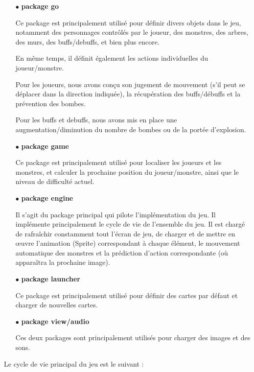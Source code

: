 \documentclass[11pt,english]{article}
\begin{document}
\begin{itemize}
    \item [$\bullet$] \textbf{package go}
    
    Ce package est principalement utilisé pour définir divers objets dans le jeu, notamment des personnages contrôlés par le joueur, des monstres, des arbres, des murs, des buffs/debuffs, et bien plus encore.
    
    En même temps, il définit également les actions individuelles du joueur/monstre. 

    Pour les joueurs, nous avons conçu son jugement de mouvement (s'il peut se déplacer dans la direction indiquée), la récupération des buffs/débuffs et la prévention des bombes.

    Pour les buffs et debuffs, nous avons mis en place une augmentation/diminution du nombre de bombes ou de la portée d'explosion.

    \item [$\bullet$] \textbf{package game}
    
    Ce package est principalement utilisé pour localiser les joueurs et les monstres, et calculer la prochaine position du joueur/monstre, ainsi que le niveau de difficulté actuel.

    \item [$\bullet$] \textbf{package engine}
    
    Il s'agit du package principal qui pilote l'implémentation du jeu. Il implémente principalement le cycle de vie de l’ensemble du jeu. Il est chargé de rafraîchir constamment tout l'écran de jeu, de charger et de mettre en œuvre l'animation (Sprite) correspondant à chaque élément, le mouvement automatique des monstres et la prédiction d'action correspondante (où apparaîtra la prochaine image).

    \item [$\bullet$] \textbf{package launcher}
    
    Ce package est principalement utilisé pour définir des cartes par défaut et charger de nouvelles cartes.

    \item [$\bullet$] \textbf{package view/audio}
    
    Ces deux packages sont principalement utilisés pour charger des images et des sons.
    

\end{itemize}

\indent Le cycle de vie principal du jeu est le suivant :
\end{document}
